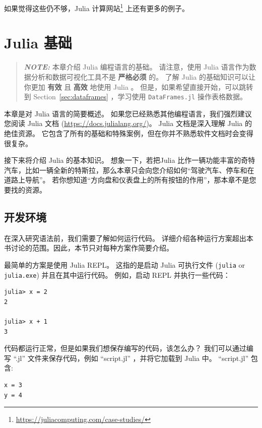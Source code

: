 \documentclass[
  notoc %
]{tufte-book}
\DeclareRobustCommand{\href}[2]{#2\footnote{\url{#1}}}
\newcommand{\passthrough}[1]{#1}
\begin{document}
如果觉得这些仍不够，\href{https://juliacomputing.com/case-studies/}{Julia
计算网站} 上还有更多的例子。

\hypertarget{sec:julia_basics}{%
\chapter{Julia 基础}\label{sec:julia_basics}}

\begin{quote}
\textbf{\emph{NOTE:}} 本章介绍 Julia 编程语言的基础。 请注意，使用 Julia
语言作为数据分析和数据可视化工具不是 \textbf{严格必须} 的。 了解 Julia
的基础知识可以让你更加 \textbf{有效} 且 \textbf{高效} 地使用 Julia 。
但是，如果希望直接开始，可以跳转到 Section~\ref{sec:dataframes}
，学习使用 \passthrough{\lstinline!DataFrames.jl!} 操作表格数据。
\end{quote}

本章是对 Julia 语言的简要概述。
如果您已经熟悉其他编程语言，我们强烈建议您阅读 Julia 文档
(\url{https://docs.julialang.org/})。 Julia 文档是深入理解 Julia
的绝佳资源。
它包含了所有的基础和特殊案例，但在你并不熟悉软件文档时会变得很复杂。

接下来将介绍 Julia 的基本知识。 想象一下，若把Julia
比作一辆功能丰富的奇特汽车，比如一辆全新的特斯拉，那么本章只会向您介绍如何``驾驶汽车、停车和在道路上导航''。
若你想知道``方向盘和仪表盘上的所有按钮的作用''，那本章不是您要找的资源。

\hypertarget{sec:ide}{%
\section{开发环境}\label{sec:ide}}

在深入研究语法前，我们需要了解如何运行代码。
详细介绍各种运行方案超出本书讨论的范围。因此，本节只对每种方案作简要介绍。

最简单的方案是使用 Julia REPL。 这指的是启动 Julia 可执行文件
(\passthrough{\lstinline!julia!} or \passthrough{\lstinline!julia.exe!})
并且在其中运行代码。 例如，启动 REPL 并执行一些代码：

\begin{lstlisting}
julia> x = 2
2

julia> x + 1
3
\end{lstlisting}

代码都运行正常，但是如果我们想保存编写的代码，该怎么办？
我们可以通过编写 ``.jl'' 文件来保存代码，例如 ``script.jl''
，并将它加载到 Julia 中。 ``script.jl'' 包含:

\begin{lstlisting}
x = 3
y = 4
\end{lstlisting}
\end{document}
